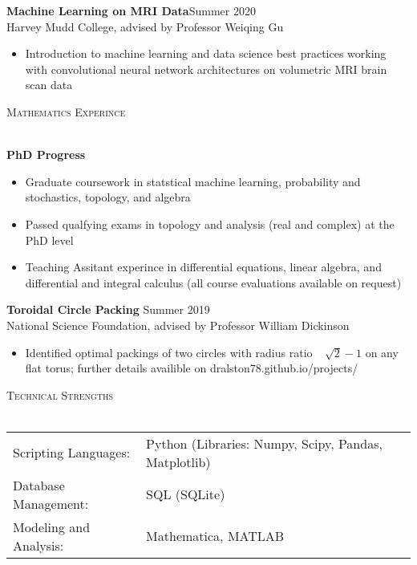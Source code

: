 \documentclass[a4paper]{article}
\newcommand{\lineunder} {
    \vspace*{-8pt} \\
    \hspace*{-18pt} \hrulefill \\
}
\newcommand{\header} [1] {
    {\hspace*{-18pt}\vspace*{6pt} \textsc{#1}}
    \vspace*{-6pt} \lineunder
}
\begin{document}
\textbf{Machine Learning on MRI Data}\hfill Summer 2020\\
Harvey Mudd College, advised by Professor Weiqing Gu \\
\vspace{2mm}
\begin{itemize} [topsep=0mm,itemsep=1mm,partopsep=1mm, parsep=1mm]
	\item Introduction to machine learning and data science best practices working with convolutional neural network architectures on volumetric MRI brain scan data
\end{itemize}
\vspace{4mm}

\header{\Large Mathematics Experince}
\vspace{2mm}

\textbf{PhD Progress} \\
\vspace{2mm}
\begin{itemize}[topsep=0mm,itemsep=1mm,partopsep=1mm, parsep=1mm]
	\item Graduate coursework in statstical machine learning, probability and stochastics, topology, and algebra
    \item Passed qualfying exams in topology and analysis (real and complex) at the PhD level
	\item Teaching Assitant experince in differential equations, linear algebra, and differential and integral calculus (all course evaluations available on request)
\end{itemize}
\vspace{2mm}

\textbf{Toroidal Circle Packing} \hfill Summer 2019\\
National Science Foundation, advised by Professor William Dickinson \\
\vspace{2mm}
\begin{itemize}[topsep=0mm,itemsep=1mm,partopsep=1mm, parsep=1mm]
	\item Identified optimal packings of two circles with radius ratio \ $\sqrt[]{2}-1$ on any flat torus; further details availible on dralston78.github.io/projects/
\end{itemize}
\vspace{4mm}

\header{\Large Technical Strengths}
\vspace{2mm}
\begin{tabular}{ l l }
    \vspace{1mm}
	Scripting Languages:   & Python (Libraries: Numpy, Scipy, Pandas, Matplotlib)           \\
    \vspace{1mm}
	Database Management:   & SQL (SQLite)        \\
	Modeling and Analysis: & Mathematica, MATLAB \\
\end{tabular}
\vspace{2mm}



\ 
\end{document}
